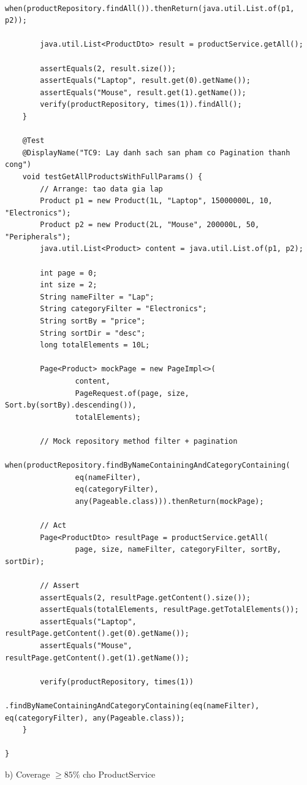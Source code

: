 \documentclass[a4paper,12pt]{article}
\begin{document}
\begin{tcolorbox}[breakable, colback=green!5,colframe=black!50,title=Test createProduct()]
\begin{lstlisting}
        when(productRepository.findAll()).thenReturn(java.util.List.of(p1, p2));

        java.util.List<ProductDto> result = productService.getAll();

        assertEquals(2, result.size());
        assertEquals("Laptop", result.get(0).getName());
        assertEquals("Mouse", result.get(1).getName());
        verify(productRepository, times(1)).findAll();
    }

    @Test
    @DisplayName("TC9: Lay danh sach san pham co Pagination thanh cong")
    void testGetAllProductsWithFullParams() {
        // Arrange: tao data gia lap
        Product p1 = new Product(1L, "Laptop", 15000000L, 10, "Electronics");
        Product p2 = new Product(2L, "Mouse", 200000L, 50, "Peripherals");
        java.util.List<Product> content = java.util.List.of(p1, p2);

        int page = 0;
        int size = 2;
        String nameFilter = "Lap";
        String categoryFilter = "Electronics";
        String sortBy = "price";
        String sortDir = "desc";
        long totalElements = 10L;

        Page<Product> mockPage = new PageImpl<>(
                content,
                PageRequest.of(page, size, Sort.by(sortBy).descending()),
                totalElements);

        // Mock repository method filter + pagination
        when(productRepository.findByNameContainingAndCategoryContaining(
                eq(nameFilter),
                eq(categoryFilter),
                any(Pageable.class))).thenReturn(mockPage);

        // Act
        Page<ProductDto> resultPage = productService.getAll(
                page, size, nameFilter, categoryFilter, sortBy, sortDir);

        // Assert
        assertEquals(2, resultPage.getContent().size());
        assertEquals(totalElements, resultPage.getTotalElements());
        assertEquals("Laptop", resultPage.getContent().get(0).getName());
        assertEquals("Mouse", resultPage.getContent().get(1).getName());

        verify(productRepository, times(1))
                .findByNameContainingAndCategoryContaining(eq(nameFilter), eq(categoryFilter), any(Pageable.class));
    }

}
\end{lstlisting}
\end{tcolorbox}
b) Coverage $\geq 85\%$ cho ProductService
\end{document}
